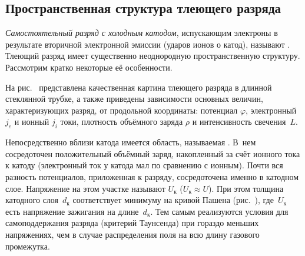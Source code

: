 \begin{labsupplement}
\subsection*{Пространственная структура тлеющего разряда}

\emph{Самостоятельный разряд с холодным катодом}, испускающим электроны
в результате вторичной электронной эмиссии 
(ударов ионов о катод), называют .
Тлеющий разряд имеет существенно неоднородную пространственную структуру. 
Рассмотрим кратко некоторые её особенности.

На рис.~ представлена качественная картина тлеющего
разряда в длинной стеклянной трубке, а также приведены зависимости
основных величин, характеризующих разряд, от продольной координаты:
потенциал $\varphi$, электронный $j_e$ и ионный $j_i$ токи,
плотность объёмного заряда $\rho$ и интенсивность свечения~$L$.

Непосредственно вблизи катода имеется область, называемая .
В~нем сосредоточен положительный объёмный заряд, накопленный за счёт
ионного тока к катоду (электронный ток у катода мал по сравнению с ионным).
Почти вся разность потенциалов, приложенная к разряду, 
сосредоточена именно в катодном слое.
Напряжение на этом участке называют
 $U_{к}$ ($U_{к} \approx U$).
При этом толщина катодного слоя~$d_{к}$ соответствует минимуму на кривой
Пашена (рис.~), где~$U_{к}$ есть напряжение зажигания
на длине~$d_{к}$. Тем самым реализуются условия для самоподдержания разряда
(критерий Таунсенда) при гораздо меньших напряжениях, 
чем в случае распределения поля на всю длину газового промежутка.


\end{labsupplement}
